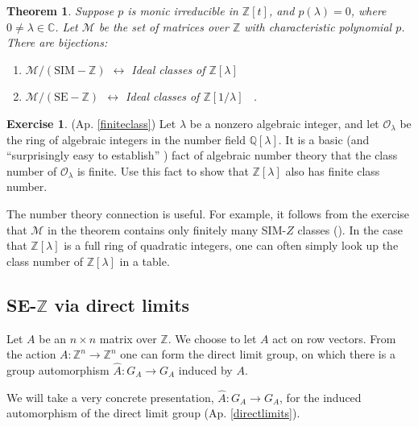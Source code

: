 \documentclass{amsart}
\newcommand{\ai}{\index[authors]}
\newtheorem{thm}[equation]{Theorem}
\theoremstyle{definition}
\newtheorem{exer}[equation]{Exercise}
\theoremstyle{definition}
\newcommand{\apr}{(Ap. \ref}
\newcommand{\Z}{\mathbb Z}
\newcommand{\Q}{\mathbb Q}
\newcommand{\C}{\mathbb C}
\numberwithin{equation}{subsection}
\begin{document}
\begin{thm}\label{thm:taussky} Suppose $p$ is monic irreducible in $\Z [t]$,
     and $p(\lambda)=0$, where
     $0\neq \lambda \in \C$.
   Let $\mathcal M$ be the set of matrices over $\Z$ with
   characteristic polynomial $p$.
   There are bijections:
\begin{enumerate}
\item    $\mathcal M/(\text{SIM}-\Z)$  $\leftrightarrow $
   Ideal classes  of $\Z[\lambda ]$ \
\cite{latimerMacDuffee,tausskyOnLatimerTheorem}\ai{Taussky-Todd, Olga}

\item
   $\mathcal M/(\text{SE}-\Z) \ \ \leftrightarrow $
    Ideal classes of $\Z[1/\lambda ]$ \  \cite{BMT1987}.
\end{enumerate}
\end{thm}


\begin{exer} \apr{finiteclass})
Let $\lambda$ be a nonzero algebraic integer, and
let $\mathcal O_{\lambda}$ be the ring of algebraic integers in the
number field $\Q [\lambda ]$.
It is a basic (and ``surprisingly easy to establish''
\cite[Ch.5]{marcusDaniel})
fact of algebraic number theory that
the class number of  $\mathcal O_{\lambda}$ is finite.
Use this fact to show that  $\Z[\lambda ]$ also has
finite class number.
\end{exer}

The number theory connection is useful. For example,
it follows from the exercise
that $\mathcal M$ in the theorem contains only finitely
many SIM-$Z$ classes (\cite[Theorem III.14]{Newman}).
In the case that  $\Z[\lambda ]$ is a full ring of
quadratic integers,  one can often simply look up the
class number of $\Z[\lambda ]$ in a table.



\subsection{SE-$\Z$ via direct limits}\label{sec:SEZdirectlimits}
   Let $A$ be an $n\times n$ matrix over
   $\Z$. We choose to let $A$ act on row vectors.
   From the action $A: \Z^n \to\Z^n $ one can form
   the direct limit group, on which there is a
   group automorphism $\hat A: G_A \to G_A$ induced by $A$.

   We will take a very concrete presentation, $\hat A: G_A \to G_A$,
   for the induced automorphism of the direct limit group
   \apr{directlimits}).
\end{document}
